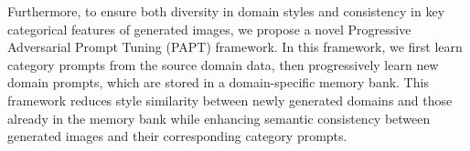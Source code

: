 Furthermore, to ensure both diversity in domain styles and consistency in key categorical features of generated images, we propose a novel Progressive Adversarial Prompt Tuning (PAPT) framework. In this framework, we first learn category prompts from the source domain data, then progressively learn new domain prompts, which are stored in a domain-specific memory bank. This framework reduces style similarity between newly generated domains and those already in the memory bank while enhancing semantic consistency between generated images and their corresponding category prompts.




